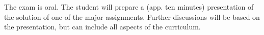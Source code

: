 The exam is oral.
The student will prepare a (app. ten minutes) presentation
of the solution of one of the major assignments.
Further discussions will be based on the presentation,
but can include all aspects of the curriculum.
